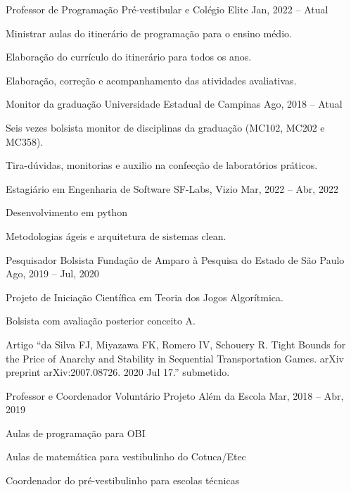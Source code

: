 \documentclass[]{awesome-cv}
\begin{document}
\vspace{-2mm}
\begin{cventries}
	\cventry
	{Professor de Programação}
	{Pré-vestibular e Colégio Elite}
	{}
	{Jan, 2022 – Atual}
	{\begin{cvitems}
		\item {Ministrar aulas do itinerário de programação para o ensino médio.}
		\item {Elaboração do currículo do itinerário para todos os anos.}
		\item {Elaboração, correção e acompanhamento das atividades avaliativas.}
		\end{cvitems}}
	\cventry
	{Monitor da graduação}
	{Universidade Estadual de Campinas}
	{}
	{Ago, 2018 – Atual}
	{\begin{cvitems}
		\item {Seis vezes bolsista monitor de disciplinas da graduação (MC102, MC202 e MC358).}
		\item {Tira-dúvidas, monitorias e auxilio na confecção de laboratórios práticos.}
		\end{cvitems}}
	\cventry
	{Estagiário em Engenharia de Software}
	{SF-Labs, Vizio}
	{}
	{Mar, 2022 – Abr, 2022}
	{\begin{cvitems}
		\item {Desenvolvimento em python}
		\item {Metodologias ágeis e arquitetura de sistemas clean.}
		\end{cvitems}}
	\cventry
	{Pesquisador Bolsista}
	{Fundação de Amparo à Pesquisa do Estado de São Paulo}
	{}
	{Ago, 2019 – Jul, 2020}
	{\begin{cvitems}
		\item {Projeto de Iniciação Científica em Teoria dos Jogos Algorítmica.}
		\item {Bolsista com avaliação posterior conceito A.}
		\item {Artigo ``da Silva FJ, Miyazawa FK, Romero IV, Schouery R. Tight Bounds for the Price of Anarchy and Stability in Sequential Transportation Games. arXiv preprint arXiv:2007.08726. 2020 Jul 17.'' submetido.}
		\end{cvitems}}
	\cventry
	{Professor e Coordenador Voluntário}
	{Projeto Além da Escola}
	{}
	{Mar, 2018 – Abr, 2019}
	{\begin{cvitems}
		\item {Aulas de programação para OBI}
		\item {Aulas de matemática para vestibulinho do Cotuca/Etec}
		\item {Coordenador do pré-vestibulinho para escolas técnicas}
		\end{cvitems}}
\end{cventries}
\end{document}
